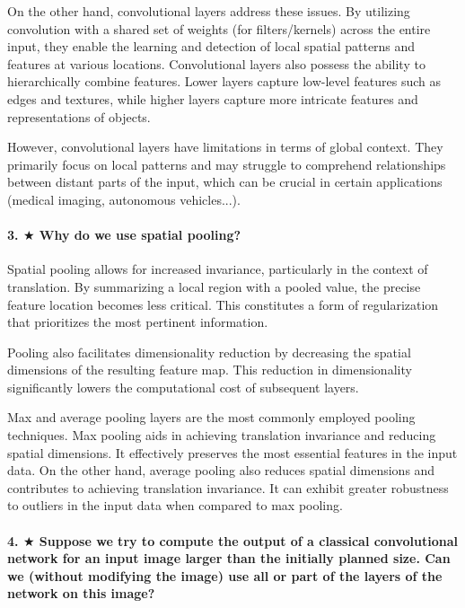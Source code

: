 \documentclass{article}
\theoremstyle{plain}%
\theoremstyle{definition}
\theoremstyle{remark}
\begin{document}
On the other hand, convolutional layers address these issues. By utilizing convolution with a shared set of weights (for filters/kernels) across the entire input, they enable the learning and detection of local spatial patterns and features at various locations. Convolutional layers also possess the ability to hierarchically combine features. Lower layers capture low-level features such as edges and textures, while higher layers capture more intricate features and representations of objects.

However, convolutional layers have limitations in terms of global context. They primarily focus on local patterns and may struggle to comprehend relationships between distant parts of the input, which can be crucial in certain applications (medical imaging, autonomous vehicles...).

\paragraph{3. $ \bigstar $ Why do we use spatial pooling?}
Spatial pooling allows for increased invariance, particularly in the context of translation. By summarizing a local region with a pooled value, the precise feature location becomes less critical. This constitutes a form of regularization that prioritizes the most pertinent information.

Pooling also facilitates dimensionality reduction by decreasing the spatial dimensions of the resulting feature map. This reduction in dimensionality significantly lowers the computational cost of subsequent layers.

Max and average pooling layers are the most commonly employed pooling techniques. Max pooling aids in achieving translation invariance and reducing spatial dimensions. It effectively preserves the most essential features in the input data. On the other hand, average pooling also reduces spatial dimensions and contributes to achieving translation invariance. It can exhibit greater robustness to outliers in the input data when compared to max pooling.

\paragraph{4. $ \bigstar $ Suppose we try to compute the output of a classical convolutional network for an input image larger than the initially planned size. Can we (without modifying the image) use all or part of the layers of the network on this image?}
\end{document}
